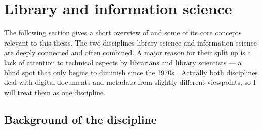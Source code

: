 \section{Library and information science}
\label{sec:lis}


\noindent The following section gives a short overview of  and some of its core concepts relevant to this thesis.  The
two disciplines library science and information science are deeply connected
and often combined. A major reason for their split up is a lack of attention
to technical aspects by librarians and library scientists --- a blind spot that
only begins to diminish since the 1970s \cite{Buckland1998b}.  Actually both
disciplines deal with digital documents and metadata from slightly different
viewpoints, so I will treat them as one discipline.

\subsection{Background of the discipline}

